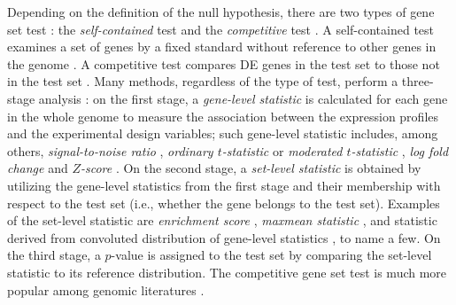\documentclass[a4,center,fleqn]{NAR}
\begin{document}
	Depending on the definition of the null hypothesis, there are two types of gene set test
	\citep{goeman2007analyzing}: the \textit{self-contained} test and the \textit{competitive} test . A
	self-contained test examines a set of genes by a fixed standard without reference to other genes in
	the genome \citep{goeman2004global,goeman2005testing,tsai2009multivariate,wu2010roast,huang2013gene}. A competitive test compares DE genes in the test set to those not in the test set \citep{tian2005discovering,wu2012camera,yaari2013quantitative}. Many methods, regardless of the type of test, perform a three-stage analysis
	\citep{khatri2012ten}: on the first stage, a \textit{gene-level statistic} is calculated for each
	gene in the whole genome to measure the association between the expression profiles and the
	experimental design variables; such gene-level statistic includes, among others,
	\textit{signal-to-noise ratio} \citep{subramanian2005gene}, \textit{ordinary $t$-statistic}
	\citep{tian2005discovering} or \textit{moderated $t$-statistic} \citep{Smyth2004moderated},
	\textit{log fold change} \citep{kim2005page} and \textit{$Z$-score} \citep{efron2007correlation}. On
	the second stage, a \textit{set-level statistic} is obtained by utilizing the gene-level statistics
	from the first stage and their membership with respect to the test set (i.e., whether the gene
	belongs to the test set). Examples of the set-level statistic are \textit{enrichment score}
	\citep{subramanian2005gene}, \textit{maxmean statistic} \citep{efron2007testing}, and statistic
	derived from convoluted distribution of gene-level statistics \citep{yaari2013quantitative}, to name
	a few. On the third stage, a $p$-value is assigned to the test set by comparing the set-level
	statistic to its reference distribution. The competitive gene set test is much more popular among
	genomic literatures \citep{goeman2007analyzing, gatti2010heading}.  
	
	
\end{document}

